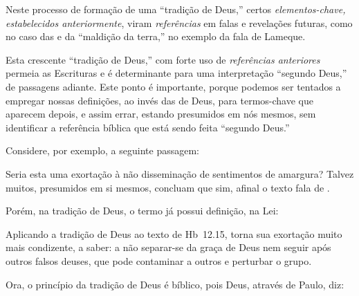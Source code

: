     Neste processo de formação de uma ``tradição de Deus,'' certos \emph{elementos-chave,  estabelecidos  anteriormente},  viram
    \emph{referências} em falas e revelações futuras, como no caso das  e da ``maldição da terra,''  no  exemplo
    da fala de Lameque.

    Esta crescente ``tradição de Deus,'' com forte uso de \emph{referências anteriores} permeia as Escrituras e  é  determinante
    para uma interpretação ``segundo Deus,'' de passagens adiante. Este ponto  é  importante,  porque  podemos  ser  tentados  a
    empregar nossas definições, ao invés das de Deus, para termos-chave que aparecem depois, e assim errar,  estando  presumidos
    em nós mesmos, sem identificar a referência bíblica que está sendo feita ``segundo Deus.''

    Considere, por exemplo, a seguinte passagem:


    Seria esta uma exortação à não disseminação de sentimentos de amargura? Talvez muitos, presumidos em si mesmos, concluam que
    sim, afinal o texto fala de .

    Porém, na tradição de Deus, o termo já possui definição, na Lei:


    Aplicando a tradição de Deus ao texto de Hb~12.15, torna sua exortação muito mais condizente, a saber: a não separar-se da
    graça de Deus nem seguir após outros falsos deuses, que pode contaminar a outros e perturbar o grupo.

    Ora, o princípio da tradição de Deus é bíblico, pois Deus, através de Paulo, diz:


